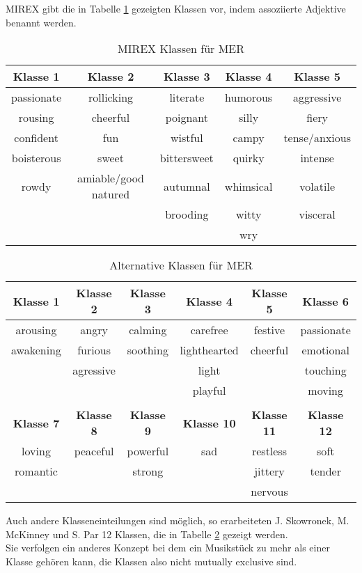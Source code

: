 \documentclass[11pt,a4paper]{article}
\begin{document}
MIREX gibt die in Tabelle \ref{tab:MIREXclasses} gezeigten Klassen vor, indem assoziierte Adjektive benannt werden.
\begin{table}[t]
\begin{tabular}{c c c c c}
\textbf{Klasse 1} & \textbf{Klasse 2} & \textbf{Klasse 3} & \textbf{Klasse 4} & \textbf{Klasse 5} \\
\hline
passionate & rollicking & literate & humorous & aggressive \\
rousing & cheerful & poignant & silly & fiery \\
confident & fun & wistful & campy & tense/anxious \\
boisterous & sweet & bittersweet & quirky & intense \\
rowdy & amiable/good natured & autumnal & whimsical & volatile \\
 & & brooding & witty & visceral \\
  & & & wry &
\end{tabular}
\caption[MIREX Music Emotion Recognition Klassen]{MIREX Klassen für MER}
\label{tab:MIREXclasses}
\end{table}
\begin{table}[!ht]
\begin{tabular}{c c c c c c}
\textbf{Klasse 1} & \textbf{Klasse 2} & \textbf{Klasse 3} & \textbf{Klasse 4} & \textbf{Klasse 5} & \textbf{Klasse 6} \\
\hline
arousing  & angry     & calming  & carefree     & festive  & passionate \\
awakening & furious   & soothing & lighthearted & cheerful & emotional \\
          & agressive &          & light        &          & touching    \\
          &           &          & playful      &          & moving      \\
\vspace{10pt}\\
\textbf{Klasse 7} & \textbf{Klasse 8} & \textbf{Klasse 9} & \textbf{Klasse 10} & \textbf{Klasse 11} & \textbf{Klasse 12}\\
\hline
loving   & peaceful & powerful & sad & restless & soft\\
romantic &          & strong   &     & jittery  & tender\\
         &          &          &     & nervous  & \\
\end{tabular}
\caption[Alternative Music Emotion Recognition Klassen]{Alternative Klassen für MER}
\label{tab:altclasses}
\end{table}
\noindent
Auch andere Klasseneinteilungen sind möglich, so erarbeiteten J. Skowronek, M. McKinney und S. Par  \cite{7cd5f337a4b030e3fafd0b4bc7e0976ff7cc1ec8c28d583c5dab695e0ee78941} 12 Klassen, die in Tabelle \ref{tab:altclasses} gezeigt werden.\\
Sie verfolgen ein anderes Konzept bei dem ein Musikstück zu mehr als einer Klasse gehören kann, die Klassen also nicht mutually exclusive sind.\\
\end{document}
